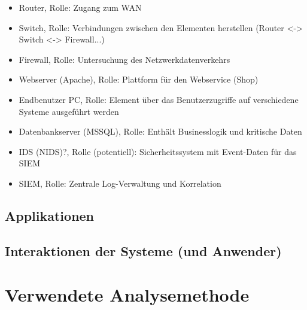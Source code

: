\begin{itemize}
\item Router, Rolle: Zugang zum WAN
\item Switch, Rolle: Verbindungen zwischen den Elementen herstellen (Router <-> Switch <-> Firewall...)
\item Firewall, Rolle: Untersuchung des Netzwerkdatenverkehrs 
\item Webserver (Apache), Rolle: Plattform für den Webservice (Shop)
\item Endbenutzer PC, Rolle: Element über das Benutzerzugriffe auf verschiedene Systeme ausgeführt werden
\item Datenbankserver (MSSQL), Rolle: Enthält Businesslogik und kritische Daten
\item IDS (NIDS)?, Rolle (potentiell): Sicherheitssystem mit Event-Daten für das SIEM
\item SIEM, Rolle: Zentrale Log-Verwaltung und Korrelation 
\end{itemize}
\subsection{Applikationen}



\subsection{Interaktionen der Systeme (und Anwender)}



\section{Verwendete Analysemethode}


